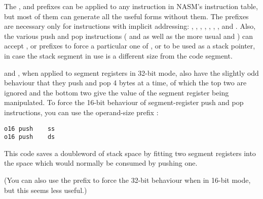 The ,  and  prefixes can be applied to
any instruction in NASM's instruction table, but most of them can
generate all the useful forms without them. The prefixes are necessary
only for instructions with implicit addressing: ,
, , , , ,
, and . Also, the various push and pop
instructions ( and  as well as the more usual
 and ) can accept ,  or
 prefixes to force a particular one of ,  or
 to be used as a stack pointer, in case the stack segment in
use is a different size from the code segment.

 and , when applied to segment registers in 32-bit
mode, also have the slightly odd behaviour that they push and pop 4
bytes at a time, of which the top two are ignored and the bottom two
give the value of the segment register being manipulated. To force
the 16-bit behaviour of segment-register push and pop instructions,
you can use the operand-size prefix :

\begin{lstlisting}
o16 push    ss
o16 push    ds
\end{lstlisting}

This code saves a doubleword of stack space by fitting two segment
registers into the space which would normally be consumed by pushing
one.

(You can also use the  prefix to force the 32-bit behaviour
when in 16-bit mode, but this seems less useful.)
